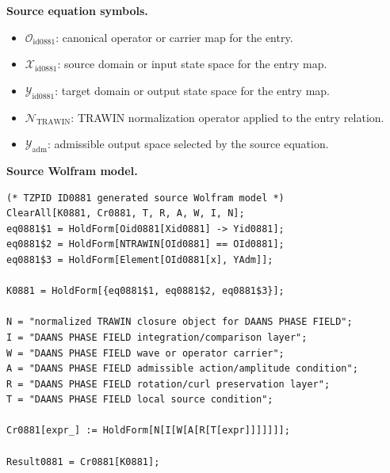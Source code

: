 \begin{minipage}[t]{0.49\linewidth}
\begingroup
\small
\raggedright
\textbf{Source equation symbols.}\par
\begin{itemize}[leftmargin=1.35em,itemsep=1pt,topsep=1pt,parsep=0pt]
    \item $\mathcal{O}_{\mathrm{id0881}}$: canonical operator or carrier map for the entry.
    \item $\mathcal{X}_{\mathrm{id0881}}$: source domain or input state space for the entry map.
    \item $\mathcal{Y}_{\mathrm{id0881}}$: target domain or output state space for the entry map.
    \item $\mathcal{N}_{\mathrm{TRAWIN}}$: TRAWIN normalization operator applied to the entry relation.
    \item $\mathcal{Y}_{\mathrm{adm}}$: admissible output space selected by the source equation.
\end{itemize}
\endgroup
\end{minipage}\hfill
\begin{minipage}[t]{0.47\linewidth}
\begingroup
\scriptsize
\raggedright
\textbf{Source Wolfram model.}\par
\begin{Verbatim}[fontsize=\tiny,breaklines=true,breakanywhere=true]
(* TZPID ID0881 generated source Wolfram model *)
ClearAll[K0881, Cr0881, T, R, A, W, I, N];
eq0881$1 = HoldForm[Oid0881[Xid0881] -> Yid0881];
eq0881$2 = HoldForm[NTRAWIN[OId0881] == OId0881];
eq0881$3 = HoldForm[Element[OId0881[x], YAdm]];

K0881 = HoldForm[{eq0881$1, eq0881$2, eq0881$3}];

N = "normalized TRAWIN closure object for DAANS PHASE FIELD";
I = "DAANS PHASE FIELD integration/comparison layer";
W = "DAANS PHASE FIELD wave or operator carrier";
A = "DAANS PHASE FIELD admissible action/amplitude condition";
R = "DAANS PHASE FIELD rotation/curl preservation layer";
T = "DAANS PHASE FIELD local source condition";

Cr0881[expr_] := HoldForm[N[I[W[A[R[T[expr]]]]]]];

Result0881 = Cr0881[K0881];
\end{Verbatim}
\endgroup
\end{minipage}

